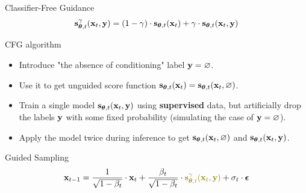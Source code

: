 \documentclass{beamer}
\renewcommand{\eqpause}{}
\begin{document}
\begin{frame}{Classifier-Free Guidance}
	\[
		\mathbf{s}^{\gamma}_{\boldsymbol{\theta}, t}(\mathbf{x}_t, \mathbf{y}) = (1 - \gamma) \cdot \mathbf{s}_{\boldsymbol{\theta}, t}(\mathbf{x}_t) +  \gamma \cdot \mathbf{s}_{\boldsymbol{\theta}, t}(\mathbf{x}_t, \mathbf{y})
	\]
	\vspace{-0.5cm}
	\begin{block}{CFG algorithm}
		\begin{itemize}
			\item Introduce "the absence of conditioning" label $\mathbf{y} = \varnothing$.		
			\eqpause
			\item Use it to get unguided score function $\mathbf{s}_{\boldsymbol{\theta}, t}(\mathbf{x}_t) = \mathbf{s}_{\boldsymbol{\theta}, t}(\mathbf{x}_t, \varnothing)$.		
			\eqpause
			\item Train a single model $\mathbf{s}_{\boldsymbol{\theta}, t}(\mathbf{x}_t, \mathbf{y})$ using \textbf{supervised} data, but artificially drop the labels $\mathbf{y}$ with some fixed probability (simulating the case of $\mathbf{y} = \varnothing$).		
			\eqpause
			\item Apply the model twice during inference to get $\mathbf{s}_{\boldsymbol{\theta}, t}(\mathbf{x}_t, \varnothing)$ and $\mathbf{s}_{\boldsymbol{\theta}, t}(\mathbf{x}_t, \mathbf{y})$.
		\end{itemize}
	\end{block}
	\vspace{-0.3cm}
	\eqpause
	\begin{block}{Guided Sampling}
		\vspace{-0.3cm}
		\[
			\bx_{t-1} = \frac{1}{\sqrt{1 - \beta_t}} \cdot \bx_t + \frac{\beta_t}{\sqrt{1 - \beta_t}} \cdot  {\color{olive}\bs^{\gamma}_{\btheta, t}(\bx_t, \by)} + \sigma_t \cdot \bepsilon
		\]
		\vspace{-0.3cm}
	\end{block}
\end{frame}
\end{document}
